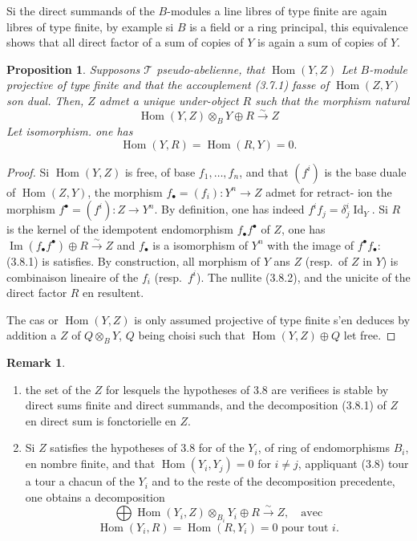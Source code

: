 \documentclass[11pt,a4paper]{article}
\theoremstyle{plain}
\newtheorem{proposition}[theorem]{Proposition}
\theoremstyle{definition}
\newtheorem{remark}[theorem]{Remark}
\DeclareMathOperator{\Hom}{Hom}
\DeclareMathOperator{\im}{Im}
\newcommand{\isom}{\xrightarrow{\sim}}
\DeclareMathOperator{\Id}{Id}
\begin{document}
Si the direct summands of the $B$-modules a line libres of type finite are again libres of type finite, by example si $B$ is a field or a ring principal, this equivalence shows that all direct factor of a sum of copies of $Y$ is again a sum of copies of $Y$.

\begin{proposition}
Supposons $\mathcal{T}$ pseudo-abelienne, that $\Hom(Y, Z)$ Let $B$-module projective of type finite and that the accouplement (3.7.1) fasse of $\Hom(Z, Y)$ son dual. Then, $Z$ admet a unique under-object $R$ such that the morphism natural
\begin{equation}
\Hom(Y, Z) \otimes_B Y \oplus R \isom Z \tag{3.8.1}
\end{equation}
Let isomorphism. one has
\begin{equation}
\Hom(Y, R) = \Hom(R, Y) = 0. \tag{3.8.2}
\end{equation}
\end{proposition}

\begin{proof}
Si $\Hom(Y, Z)$ is free, of base $f_1, \ldots, f_n$, and that $(f^i)$ is the base duale of $\Hom(Z, Y)$, the morphism $f_\bullet = (f_i) : Y^n \to Z$ admet for retract-
ion the morphism $f^\bullet = (f^i) : Z \to Y^n$. By definition, one has indeed $f^i f_j = \delta^i_j \Id_Y$. Si $R$ is the kernel of the idempotent endomorphism $f_\bullet f^\bullet$ of $Z$, one has $\im(f_\bullet f^\bullet) \oplus R \isom Z$ and $f_\bullet$ is a isomorphism of $Y^n$ with the image of $f^\bullet f_\bullet$: (3.8.1) is satisfies. By construction, all morphism of $Y$ ans $Z$ (resp.~of $Z$ in $Y$) is combinaison lineaire of the $f_i$ (resp.~$f^i$). The nullite (3.8.2), and the unicite of the direct factor $R$ en resultent.

The cas or $\Hom(Y, Z)$ is only assumed projective of type finite s'en deduces by addition a $Z$ of $Q \otimes_B Y$, $Q$ being choisi such that $\Hom(Y, Z) \oplus Q$ let free.
\end{proof}

\begin{remark}
\begin{enumerate}[label=(\roman*)]
\item the set of the $Z$ for lesquels the hypotheses of 3.8 are verifiees is stable by direct sums finite and direct summands, and the decomposition (3.8.1) of $Z$ en direct sum is fonctorielle en $Z$.

\item Si $Z$ satisfies the hypotheses of 3.8 for of the $Y_i$, of ring of endomorphisms $B_i$, en nombre finite, and that $\Hom(Y_i, Y_j) = 0$ for $i \neq j$, appliquant (3.8) tour a tour a chacun of the $Y_i$ and to the reste of the decomposition precedente, one obtains a decomposition
\begin{equation}
\bigoplus \Hom(Y_i, Z) \otimes_{B_i} Y_i \oplus R \isom Z, \quad \text{avec} \tag{3.9.1}
\end{equation}
\begin{equation}
\Hom(Y_i, R) = \Hom(R, Y_i) = 0 \text{ pour tout } i. \tag{3.9.2}
\end{equation}
\end{enumerate}
\end{remark}
\end{document}
